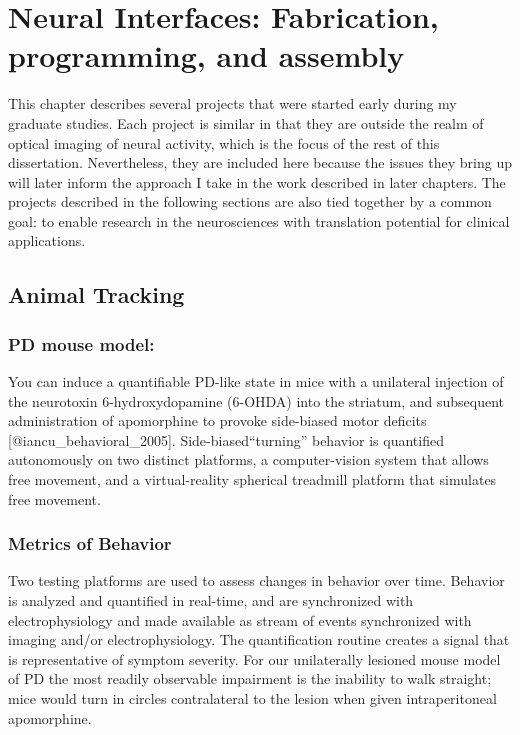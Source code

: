 \chapter{
  Neural Interfaces: Fabrication, programming, and assembly} \label{neural-interfaces-fabrication-programming-and-assembly} \thispagestyle{myheadings} 

\graphicspath{{2_body/figures/}} 

This chapter describes several projects that were started early during my graduate studies.
Each project is similar in that they are outside the realm of optical imaging of neural activity, which is the focus of the rest of this dissertation.
Nevertheless, they are included here because the issues they bring up will later inform the approach I take in the work described in later chapters.
The projects described in the following sections are also tied together by a common goal: to enable research in the neurosciences with translation potential for clinical applications.

\section{
  Animal Tracking}\label{animal-tracking} 

\subsection{PD mouse model:}\label{pd-mouse-model} 

You can induce a quantifiable PD-like state in mice with a unilateral injection of the neurotoxin 6-hydroxydopamine (6-OHDA) into the striatum, and subsequent administration of apomorphine to provoke side-biased motor deficits {[}@iancu\_behavioral\_2005{]}.
Side-biased``turning'' behavior is quantified autonomously on two distinct platforms, a computer-vision system that allows free movement, and a virtual-reality spherical treadmill platform that simulates free movement.

\subsection{
	Metrics of Behavior}\label{metrics-of-behavior} 

Two testing platforms are used to assess changes in behavior over time.
Behavior is analyzed and quantified in real-time, and are synchronized with electrophysiology and made available as stream of events synchronized with imaging and/or electrophysiology.
The quantification routine creates a signal that is representative of symptom severity.
For our unilaterally lesioned mouse model of PD the most readily observable impairment is the inability to walk straight;
mice would turn in circles
contralateral to the lesion when given intraperitoneal apomorphine.

